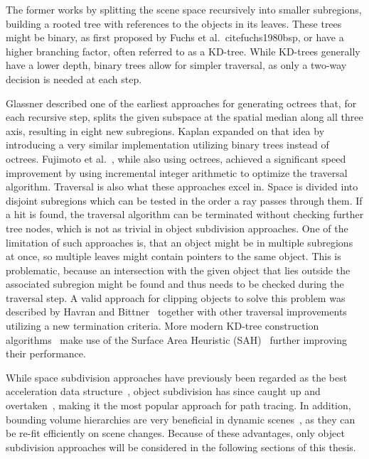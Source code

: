 The former works by splitting the scene space recursively into smaller subregions, building a rooted tree with references to the objects in its leaves. These trees might be binary, as first proposed by Fuchs et al.~cite{fuchs1980bsp}, or have a higher branching factor, often referred to as a KD-tree. While KD-trees generally have a lower depth, binary trees allow for simpler traversal, as only a two-way decision is needed at each step.

Glassner\cite{glassner_space_1984} described one of the earliest approaches for generating octrees that, for each recursive step, splits the given subspace at the spatial median along all three axis, resulting in eight new subregions. Kaplan\cite{kaplan_use_1985} expanded on that idea by introducing a very similar implementation utilizing binary trees instead of octrees. Fujimoto et al.~\cite{fujimoto_arts_1986}, while also using octrees, achieved a significant speed improvement by using incremental integer arithmetic to optimize the traversal algorithm. Traversal is also what these approaches excel in. Space is divided into disjoint subregions which can be tested in the order a ray passes through them. If a hit is found, the traversal algorithm can be terminated without checking further tree nodes, which is not as trivial in object subdivision approaches. One of the limitation of such approaches is, that an object might be in multiple subregions at once, so multiple leaves might contain pointers to the same object. This is problematic, because an intersection with the given object that lies outside the associated subregion might be found and thus needs to be checked during the traversal step. A valid approach for clipping objects to solve this problem was described by Havran and Bittner~\cite{Havran02onimproving} together with other traversal improvements utilizing a new termination criteria. More modern KD-tree construction algorithms~\cite{roccia2012kdtree,choi2010sahKdTree,wu2011sahKdTree} make use of the Surface Area Heuristic (SAH)~\cite{macdonald_heuristics_1990} further improving their performance.

While space subdivision approaches have previously been regarded as the best acceleration data structure~\cite{havrand2000comparison}, object subdivision has since caught up and overtaken~\cite{vinkler2015comparison}, making it the most popular approach for path tracing. In addition, bounding volume hierarchies are very beneficial in dynamic scenes~\cite{wald_ray_2007}, as they can be re-fit efficiently on scene changes. Because of these advantages, only object subdivision approaches will be considered in the following sections of this thesis.

